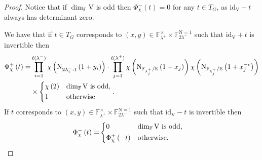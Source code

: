 \documentclass[12pt, reqno]{amsart}
\theoremstyle{definition}
\theoremstyle{definition}
\theoremstyle{definition}
\newcommand{\multiplicativegroup}[1]{#1^{\times}}
\newcommand{\idmap}{\mathrm{id}}
\newcommand{\lengthof}{\ell}
\newcommand{\hermitianSpace}{\mathrm{V}}
\newcommand{\minusInvolution}[1]{#1^{-c}}
\newcommand{\FieldNorm}[2]{\mathrm{N}_{#1:#2}}
\newcommand{\aFieldNorm}{\mathrm{N}}
\newcommand{\finiteField}{\mathbb{F}}
\newcommand{\quadraticExtension}{\mathbb{E}}
\newcommand{\finiteFieldExtension}[1]{\finiteField_{#1}}
\newcommand{\NormOneGroup}[1]{\finiteFieldExtension{#1}^{\aFieldNorm = 1}}
\newcommand{\posJacobiKernel}[1]{\Phi^{+}_{#1}}
\newcommand{\negJacobiKernel}[1]{\Phi^{-}_{#1}}
\begin{document}
\begin{proof}
	Notice that if $\dim_{\finiteField} \hermitianSpace$ is odd then $\negJacobiKernel{\chi}\left(t\right) = 0$ for any $t \in T_{G}$, as $\idmap_{\hermitianSpace} - t$ always has determinant zero.
	
	We have that if $t \in T_G$ corresponds to $\left(x,y\right) \in \multiplicativegroup{\finiteFieldExtension{\lambda^+}} \times \NormOneGroup{2 \lambda^{-}}$ such that $\idmap_{\hermitianSpace} + t$ is invertible then \begin{align*}
		\posJacobiKernel{\chi}\left(t\right) =& \prod_{i=1}^{\lengthof(\lambda^-)} \chi\left(\FieldNorm{2 \lambda^-_i}{1}\left(1 + y_i\right)\right) \cdot \prod_{j=1}^{\lengthof(\lambda^+)} \chi\left(\aFieldNorm_{\finiteFieldExtension{\lambda_j^+} / \quadraticExtension}\left(1 + x_j\right)\right) \chi\left(\aFieldNorm_{\finiteFieldExtension{\lambda_j^+} / \quadraticExtension}\left(1 + \minusInvolution{x_j}\right)\right) \\
		& \times  \begin{dcases}
			\chi\left(2\right) & \dim_{\finiteField} \hermitianSpace \text{ is odd},\\
			1 & \text{otherwise}
		\end{dcases}.
	\end{align*}
	If $t$ corresponds to $\left(x,y\right) \in \multiplicativegroup{\finiteFieldExtension{\lambda^+}} \times \NormOneGroup{2 \lambda^{-}}$ such that $\idmap_{\hermitianSpace} - t$ is invertible then \begin{align*}
		\negJacobiKernel{\chi}\left(t\right) =& \begin{dcases}
			0 & \dim_{\finiteField} \hermitianSpace \text{ is odd},\\
			\posJacobiKernel{\chi}\left(-t\right) & \text{otherwise.}
		\end{dcases}
	\end{align*}
	


\end{proof}
\end{document}
